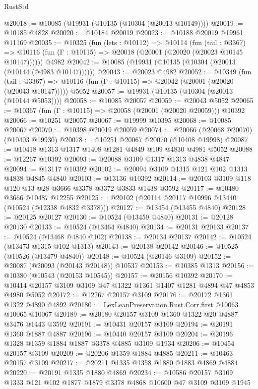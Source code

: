 \begin{lexlean}{RustStd}
\begin{coremodule}
@20018 := @10085 (@19931 (@10135 (@10304 (@20013 @10149))))
@20019 := @10185 @4828
@20020 := @10184 @20019
@20023 := @10188 @20019 @19961 @11169
@20035 := @10325
    (fun (lets : @10112) =>
    @10114
      (fun (tail : @3367) =>
      @10116 (fun (Γ : @10115) => @20018 (@20001 (@20020 (@20023 @10145 @10147))))))
    @4982
@20042 := @10085 (@19931 (@10135 (@10304 (@20013 (@10144 (@4983 @10147))))))
@20043 := @20023 @4982
@20052 := @10349
    (fun (tail : @3367) => @10116 (fun (Γ : @10115) => @20042 (@20001 (@20020 (@20043 @10147)))))
    @5052
@20057 := @19931 (@10135 (@10304 (@20013 (@10144 @5053))))
@20058 := @10085 @20057
@20059 := @20043 @5052
@20065 := @10367 (fun (Γ : @10115) => @20058 (@20001 (@20020 @20059))) @10392
@20066 := @10251 @20057
@20067 := @19999 @10395
@20068 := @10085 @20067
@20070 := @10398 @20019 @20059
@20074 := @20066 (@20068 @20070) (@10403 @19930)
@20078 := @10251 @20067 @20070 (@10408 @19998)
@20087 := @10418 @1313 @1317 @1408 @1281 @4849 @109 @4830 @4981 @5052
@20088 := @12267 @10392
@20093 := @20088 @3109 @1317 @1313 @4838 @4847
@20094 := @13117 @10392
@20102 := @20094 @3109 @1315 @121 @102 @1313 @4838 @4845 @4840
@20103 := @13136 @10392
@20114 := @20103 @3109 @118 @120 @13 @28 @3666 @3378 @3372 @3833 @1438 @3592
@20117 := @10480 @3666 @10487 @12255
@20125 := @20102 (@20114 @20117 @10996 @13440 (@10524 (@12338 @4832 @3378)))
@20127 := @13454 (@13455 @4840)
@20128 := @20125 @20127
@20130 := @10524 (@13459 @4840)
@20131 := @20128 @20130
@20133 := @10524 (@13464 @4840)
@20134 := @20131 @20133
@20137 := @10524 (@13468 @4840 @102)
@20138 := @20134 @20137
@20142 := @10524 (@13473 @1315 @102 @1313)
@20143 := @20138 @20142
@20146 := @10525 (@10526 (@13479 @4840))
@20148 := @10524 (@20146 @3109)
@20152 := @20087 (@20093 (@20143 @20148)) @10537
@20153 := @10385 @1313
@20156 := @10380 (@10543 (@20153 @10545))
@20157 := @20156 @10392
@20170 := @10414 @20157 @3109 @3109 @47 @1322 @1361 @1407 @1281 @4894 @47 @4853 @4980 @5052
@20172 := @12267 @20157 @3109
@20176 := @20172 @1361 @1322 @4890 @4892
@20180 := LexLeanPreservation.Rust.Corr.first @10063 @10065 @10067
@20189 := @20180 @20157 @3109 @1360 @1322 @20 @4887 @3476 @1443 @3592
@20191 := @10431 @20157 @3109
@20194 := @20191 @1360 @1887 @4887
@20196 := @10440 @20157 @3109
@20204 := @20196 @1328 @1359 @1884 @1887 @3378 @4885 @3109 @1934
@20206 := @10454 @20157 @3109
@20209 := @20206 @1359 @1884 @4885
@20211 := @10463 @20157 @3109
@20217 := @20211 @1335 @1358 @1880 @1883 @4869 @4884
@20220 := @20191 @1335 @1880 @4869
@20234 := @10586 @20157 @3109 @1333 @121 @102 @1877 @1879 @3378 @4868 @10600 @47 @3109 @3109 @1945

\end{coremodule}
\end{lexlean}
